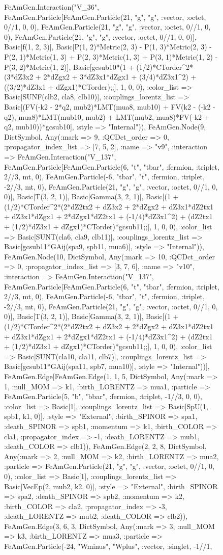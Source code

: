 \documentclass{revtex4}
\begin{document}
\begin{figure}[!htb]
\begin{center}
{FeAmGen.Interaction("V_36", FeAmGen.Particle[FeAmGen.Particle(21, "g", "g", :vector, :octet, 0//1, 0, 0), FeAmGen.Particle(21, "g", "g", :vector, :octet, 0//1, 0, 0), FeAmGen.Particle(21, "g", "g", :vector, :octet, 0//1, 0, 0)], Basic[f(1, 2, 3)], Basic[P(1, 2)*Metric(2, 3) - P(1, 3)*Metric(2, 3) - P(2, 1)*Metric(1, 3) + P(2, 3)*Metric(1, 3) + P(3, 1)*Metric(1, 2) - P(3, 2)*Metric(1, 2)], Basic[gcsub10*(1 + (1/2)*CTorder^2*(3*dZ3x2 + 2*dZgx2 + 3*dZ3x1*dZgx1 + (3/4)*dZ3x1^2) + ((3/2)*dZ3x1 + dZgx1)*CTorder);;], 1, 0, 0), :color_list => Basic[SUNF(clb2, cla8, clb10)], :couplings_lorentz_list => Basic[(FV(-k2 - 2*q2, mub2)*LMT(mua8, mub10) + FV(k2 - (-k2 - q2), mua8)*LMT(mub10, mub2) + LMT(mub2, mua8)*FV(-k2 + q2, mub10))*gcsub10], :style => "Internal")), FeAmGen.Node(9, Dict{Symbol, Any}(:mark => 9, :QCDct_order => 0, :propagator_index_list => [7, 5, 2], :name => "v9", :interaction => FeAmGen.Interaction("V_137", FeAmGen.Particle[FeAmGen.Particle(6, "t", "tbar", :fermion, :triplet, 2//3, mt, 0), FeAmGen.Particle(-6, "tbar", "t", :fermion, :triplet, -2//3, mt, 0), FeAmGen.Particle(21, "g", "g", :vector, :octet, 0//1, 0, 0)], Basic[T(3, 2, 1)], Basic[Gamma(3, 2, 1)], Basic[(1 + (1/2)*CTorder^2*(2*dZ2tx2 + dZ3x2 + 2*dZgx2 + dZ3x1*dZ2tx1 + dZ3x1*dZgx1 + 2*dZgx1*dZ2tx1 + (-1/4)*dZ3x1^2) + (dZ2tx1 + (1/2)*dZ3x1 + dZgx1)*CTorder)*gcsub11;;], 1, 0, 0), :color_list => Basic[SUNT(cla6, cla9, clb11)], :couplings_lorentz_list => Basic[gcsub11*GAij(spa9, spb11, mua6)], :style => "Internal")), FeAmGen.Node(10, Dict{Symbol, Any}(:mark => 10, :QCDct_order => 0, :propagator_index_list => [3, 7, 6], :name => "v10", :interaction => FeAmGen.Interaction("V_137", FeAmGen.Particle[FeAmGen.Particle(6, "t", "tbar", :fermion, :triplet, 2//3, mt, 0), FeAmGen.Particle(-6, "tbar", "t", :fermion, :triplet, -2//3, mt, 0), FeAmGen.Particle(21, "g", "g", :vector, :octet, 0//1, 0, 0)], Basic[T(3, 2, 1)], Basic[Gamma(3, 2, 1)], Basic[(1 + (1/2)*CTorder^2*(2*dZ2tx2 + dZ3x2 + 2*dZgx2 + dZ3x1*dZ2tx1 + dZ3x1*dZgx1 + 2*dZgx1*dZ2tx1 + (-1/4)*dZ3x1^2) + (dZ2tx1 + (1/2)*dZ3x1 + dZgx1)*CTorder)*gcsub11;;], 1, 0, 0), :color_list => Basic[SUNT(cla10, cla11, clb7)], :couplings_lorentz_list => Basic[gcsub11*GAij(spa11, spb7, mua10)], :style => "Internal"))], FeAmGen.Edge[FeAmGen.Edge(1, 1, 5, Dict{Symbol, Any}(:mark => 1, :null_MOM => k1, :birth_LORENTZ => mua1, :particle => FeAmGen.Particle(5, "b", "bbar", :fermion, :triplet, -1//3, 0, 0), :color_list => Basic[1], :couplings_lorentz_list => Basic[SpU(1, spb1, k1, 0)], :style => "External", :birth_SPINOR => spa1, :death_SPINOR => spb1, :momentum => k1, :birth_COLOR => cla1, :propagator_index => -1, :death_LORENTZ => mub1, :death_COLOR => clb1)), FeAmGen.Edge(2, 2, 8, Dict{Symbol, Any}(:mark => 2, :null_MOM => k2, :birth_LORENTZ => mua2, :particle => FeAmGen.Particle(21, "g", "g", :vector, :octet, 0//1, 0, 0), :color_list => Basic[1], :couplings_lorentz_list => Basic[VecEp(2, mub2, k2, 0)], :style => "External", :birth_SPINOR => spa2, :death_SPINOR => spb2, :momentum => k2, :birth_COLOR => cla2, :propagator_index => -3, :death_LORENTZ => mub2, :death_COLOR => clb2)), FeAmGen.Edge(3, 6, 3, Dict{Symbol, Any}(:mark => 3, :null_MOM => k3, :birth_LORENTZ => mua3, :particle => FeAmGen.Particle(-24, "Wminus", "Wplus", :vector, :singlet, -1//1, }
\end{center}
\end{figure}
\end{document}
